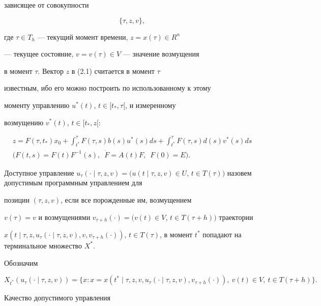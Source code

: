 зависящее от совокупности


\begin{equation}


\{\tau,z,v \},


\end{equation}


где $\tau \in T_{h}$ --- текущий момент времени, $z=x(\tau) \in R^n$


--- текущее состояние, $v=v(\tau) \in V$ --- значение возмущения


в момент $\tau$. Вектор $z$ в (2.1) считается в момент $\tau$


известным, ибо его можно построить по использованному к этому


моменту управлению $u^*(t)$, $t \in [t_*, \tau[$, и измеренному


возмущению $v^*(t)$, $t \in [t_*,z[$:


\begin{gather*}


z=F(\tau,t_*)x_0+\int_{t^*}^{\tau}F(\tau,s)b(s)u^*(s)ds+


\int_{t^*}^{\tau}F(\tau,s)d(s)v^*(s)ds \\


\big(F(t,s)=F(t)F^{-1}(s),\ \; \Dot F=A(t)F,\ \; F(0)=E\big).


\end{gather*}


Доступное управление $u_{\tau}(\cdot\mid\tau,z,v)=(u(t\mid\tau,z,v)\in


U$, $t \in T(\tau))$ назовем допустимым программным управлением для


позиции $(\tau,z,v)$, если все порожденные им, возмущением


$v(\tau)=v$ и возмущениями $v_{\tau+h}(\cdot)=(v(t) \in V$, $t \in


T(\tau+h))$ траектории


$x(t\mid\tau,z,u_{\tau}(\cdot\mid\tau,z,v),v,v_{\tau+h}(\cdot))$, $t \in


T(\tau)$, в момент $t^*$ попадают на терминальное множество $X^*$.


Обозначим


$$


X_{t^*}(u_{\tau}(\cdot\mid\tau,z,v))=\{x:x=x(t^*\mid\tau,z,v,


u_{\tau}(\cdot\mid\tau,z,v),v_{\tau+h}(\cdot)),\ v(t) \in V,\ t \in


T(\tau+h)\}.


$$


Качество допустимого управления


